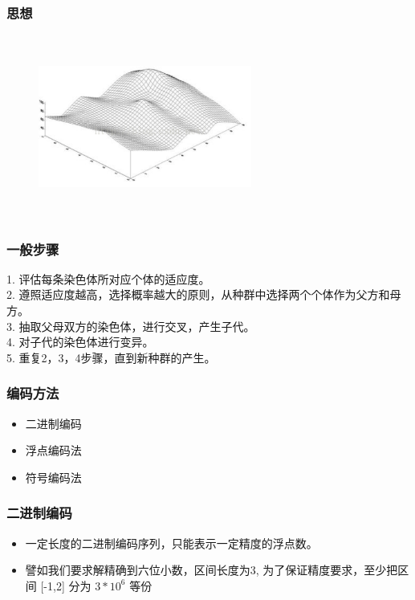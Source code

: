\documentclass[handout]{beamer}
\begin{document}
	\begin{frame}
		\frametitle{思想}
		\begin{figure}[htbp]
			\centering
			\includegraphics[width=7cm,height=6cm]{figure/3.png}
		\end{figure}
	\end{frame}
	
	\begin{frame}
		\frametitle{一般步骤}
		
			 1. 评估每条染色体所对应个体的适应度。\\
			2. 遵照适应度越高，选择概率越大的原则，从种群中选择两个个体作为父方和母方。\\
			 3. 抽取父母双方的染色体，进行交叉，产生子代。\\
			 4. 对子代的染色体进行变异。\\
			 5. 重复2，3，4步骤，直到新种群的产生。	
	
	\end{frame}
	
	\begin{frame}
		\frametitle{编码方法}
		\begin{itemize}
			\item 二进制编码
			\item 浮点编码法
			\item 符号编码法		
		\end{itemize}
	\end{frame}
	
	\begin{frame}
		\frametitle{二进制编码}
		\begin{itemize}
			\item  一定长度的二进制编码序列，只能表示一定精度的浮点数。
			\item  譬如我们要求解精确到六位小数，区间长度为3, 为了保证精度要求，至少把区间 [-1,2] 分为 $3 * 10^6$ 等份
		\end{itemize}
	\end{frame}
	
\end{document}
